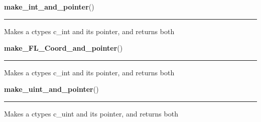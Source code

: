     \label{xformslib:library:make_int_and_pointer}

    \vspace{0.5ex}

\hspace{.8\funcindent}\begin{boxedminipage}{\funcwidth}

    \raggedright \textbf{make\_int\_and\_pointer}()

    \vspace{-1.5ex}

    \rule{\textwidth}{0.5\fboxrule}
\setlength{\parskip}{2ex}

Makes a ctypes c\_int and its pointer, and returns both
\setlength{\parskip}{1ex}
    \end{boxedminipage}

    \label{xformslib:library:make_int_and_pointer}

    \vspace{0.5ex}

\hspace{.8\funcindent}\begin{boxedminipage}{\funcwidth}

    \raggedright \textbf{make\_FL\_Coord\_and\_pointer}()

    \vspace{-1.5ex}

    \rule{\textwidth}{0.5\fboxrule}
\setlength{\parskip}{2ex}

Makes a ctypes c\_int and its pointer, and returns both
\setlength{\parskip}{1ex}
    \end{boxedminipage}

    \label{xformslib:library:make_uint_and_pointer}

    \vspace{0.5ex}

\hspace{.8\funcindent}\begin{boxedminipage}{\funcwidth}

    \raggedright \textbf{make\_uint\_and\_pointer}()

    \vspace{-1.5ex}

    \rule{\textwidth}{0.5\fboxrule}
\setlength{\parskip}{2ex}

Makes a ctypes c\_uint and its pointer, and returns both
\setlength{\parskip}{1ex}
    \end{boxedminipage}

